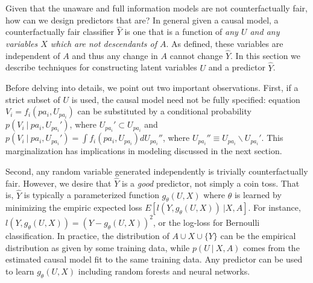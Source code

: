 Given that the unaware and full information models are not counterfactually fair, how can we design predictors that are? In general given a causal model, a counterfactually fair classifier $\hat Y$ is one that is a function of \emph{any $U$ and any variables $X$ which are not descendants of $A$}. As defined, these variables are independent of $A$ and thus any change in $A$ cannot change $\hat Y$. In this section we describe techniques for constructing latent variables $U$ and a predictor $\hat Y$.

Before delving into details, we point out two important observations. First, if a strict subset of $U$ is used, the
causal model need not be fully specified: equation
$V_i = f_i(pa_i, U_{pa_i})$ can be substituted by a conditional
probability $p(V_i\ |\ pa_i, U_{pa_i}')$, where
$U_{pa_i}' \subset U_{pa_i}$ and
$p(V_i\ |\ pa_i, U_{pa_i}') = \int f_i(pa_i, U_{pa_i}) d U_{pa_i}''$,
where $U_{pa_i}'' \equiv U_{pa_i} \backslash U_{pa_i}'$. This
marginalization has implications in modeling discussed in the next
section.

Second, any random variable generated independently is trivially
counterfactually fair. However, we desire that $\hat Y$ is a {\it
  good} predictor, not simply a coin toss. That is,
$\hat Y$ is typically a parameterized function
$g_\theta(U, X)$ where $\theta$ is learned by minimizing the empiric
expected loss $E[l(Y, g_\theta(U, X))\ | X, A]$. %
For instance, $l(Y, g_\theta(U, X)) = (Y - g_\theta(U, X))^2$, or the
log-loss for Bernoulli classification.  In practice, the distribution
of $A \cup X \cup \{Y\}$ can be the empirical distribution as given by
some training data, while $p(U\ |\ X, A)$ comes from the estimated
causal model fit to the same training data. %
Any predictor can be used to learn $g_\theta(U, X)$
including random forests and neural networks.

